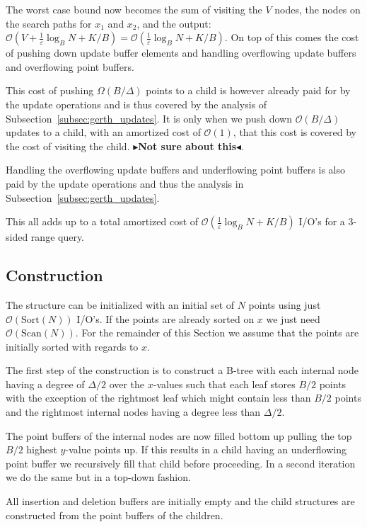 \documentclass[twoside,11pt,openright]{report}
\def \epsilon {\varepsilon}
\newcommand{\todo}[1]{{\color[rgb]{.5,0,0}\textbf{$\blacktriangleright$#1$\blacktriangleleft$}}}
\begin{document}
The worst case bound now becomes the sum of visiting the $V$ nodes, the nodes on the search paths for $x_1$ and $x_2$, and the output: $\mathcal{O}(V+\frac{1}{\epsilon}\log_B N + K/B) = \mathcal{O}(\frac{1}{\epsilon}\log_B N + K/B)$.
On top of this comes the cost of pushing down update buffer elements and handling overflowing update buffers and overflowing point buffers.

This cost of pushing $\Omega(B/\Delta)$ points to a child is however already paid for by the update operations and is thus covered by the analysis of Subsection~\ref{subsec:gerth_updates}. It is only when we push down $\mathcal{O}(B/\Delta)$ updates to a child, with an amortized cost of $\mathcal{O}(1)$, that this cost is covered by the cost of visiting the child. \todo{Not sure about this}.

Handling the overflowing update buffers and underflowing point buffers is also paid by the update operations and thus the analysis in Subsection~\ref{subsec:gerth_updates}.

This all adds up to a total amortized cost of $\mathcal{O}(\frac{1}{\epsilon} \log_B N + K/B)$ I/O's for a 3-sided range query.

\subsection{Construction}
The structure can be initialized with an initial set of $N$ points using just $\mathcal{O}(\text{Sort}(N))$ I/O's. If the points are already sorted on $x$ we just need $\mathcal{O}(\text{Scan}(N))$. For the remainder of this Section we assume that the points are initially sorted with regards to $x$.

The first step of the construction is to construct a B-tree with each internal node having a degree of $\Delta/2$ over the $x$-values such that each leaf stores $B/2$ points with the exception of the rightmost leaf which might contain less than $B/2$ points and the rightmost internal nodes having a degree less than $\Delta/2$.

The point buffers of the internal nodes are now filled bottom up pulling the top $B/2$ highest $y$-value points up. If this results in a child having an underflowing point buffer we recursively fill that child before proceeding. In a second iteration we do the same but in a top-down fashion.

All insertion and deletion buffers are initially empty and the child structures are constructed from the point buffers of the children.
\end{document}
